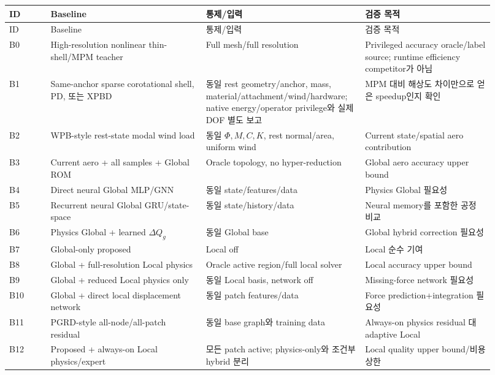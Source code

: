 \documentclass[11pt,a4paper]{article}
\begin{document}
\begin{longtable}{L{0.08\linewidth}L{0.30\linewidth}L{0.29\linewidth}L{0.25\linewidth}}
\toprule
ID & Baseline & 통제/입력 & 검증 목적 \\
\midrule
\endfirsthead
\toprule
ID & Baseline & 통제/입력 & 검증 목적 \\
\midrule
\endhead
B0 & High-resolution nonlinear thin-shell/MPM teacher & Full mesh/full resolution &
Privileged accuracy oracle/label source; runtime efficiency competitor가 아님 \\
\addlinespace
B1 & Same-anchor sparse corotational shell, PD, 또는 XPBD & 동일 rest geometry/anchor, mass, material/attachment/wind/hardware; native energy/operator privilege와 실제 DOF 별도 보고 & MPM 대비 해상도 차이만으로 얻은 speedup인지 확인 \\
\addlinespace
B2 & WPB-style rest-state modal wind load & 동일 \(\Phi,M,C,K\), rest normal/area, uniform wind & Current state/spatial aero contribution \\
\addlinespace
B3 & Current aero + all samples + Global ROM & Oracle topology, no hyper-reduction & Global aero accuracy upper bound \\
\addlinespace
B4 & Direct neural Global MLP/GNN & 동일 state/features/data & Physics Global 필요성 \\
\addlinespace
B5 & Recurrent neural Global GRU/state-space & 동일 state/history/data & Neural memory를 포함한 공정 비교 \\
\addlinespace
B6 & Physics Global + learned \(\Delta Q_g\) & 동일 Global base & Global hybrid correction 필요성 \\
\addlinespace
B7 & Global-only proposed & Local off & Local 순수 기여 \\
\addlinespace
B8 & Global + full-resolution Local physics & Oracle active region/full local solver & Local accuracy upper bound \\
\addlinespace
B9 & Global + reduced Local physics only & 동일 Local basis, network off & Missing-force network 필요성 \\
\addlinespace
B10 & Global + direct local displacement network & 동일 patch features/data & Force prediction+integration 필요성 \\
\addlinespace
B11 & PGRD-style all-node/all-patch residual & 동일 base graph와 training data & Always-on physics residual 대 adaptive Local \\
\addlinespace
B12 & Proposed + always-on Local physics/expert & 모든 patch active; physics-only와 조건부 hybrid 분리 & Local quality upper bound/비용 상한 \\

\end{longtable}
\end{document}
